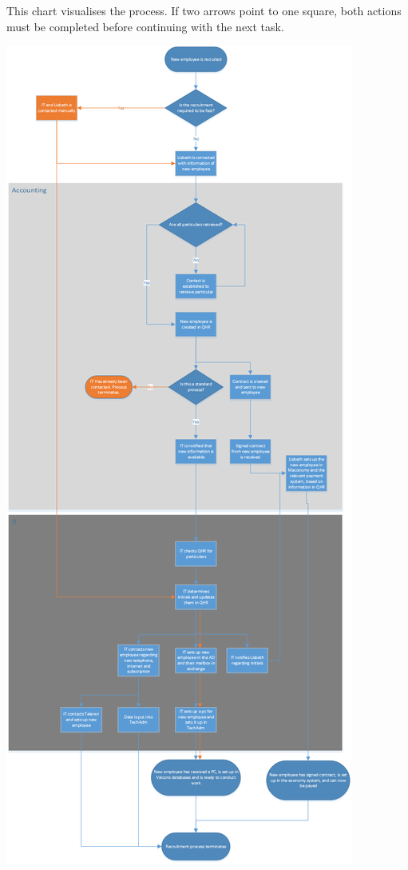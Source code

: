 \label{app:ProcessChart}

This chart visualises the process.
If two arrows point to one square, both actions must be completed before continuing with the next task.   

\includegraphics[scale=0.325]{appendix/ProcessFlowChart.png}
